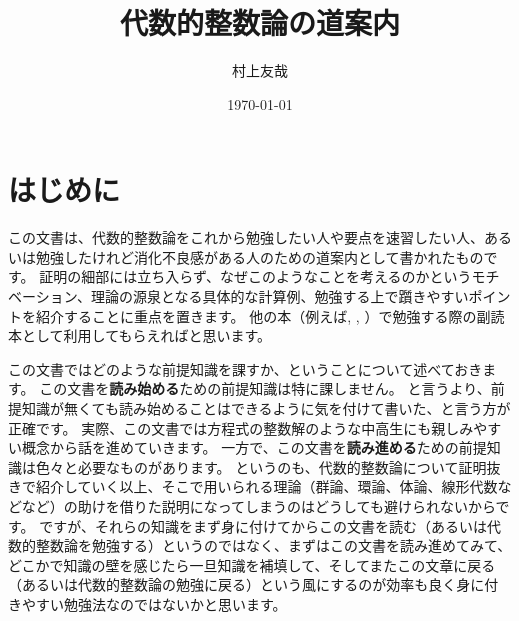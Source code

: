 \documentclass[11pt,b5paper,oneside,titlepage,lualatex]{ltjsreport}
\begin{document}

\title{代数的整数論の道案内}
\author{村上友哉}
\date{\today}
\maketitle



\chapter*{はじめに} \label{chap:intro}


この文書は、代数的整数論をこれから勉強したい人や要点を速習したい人、あるいは勉強したけれど消化不良感がある人のための道案内として書かれたものです。
証明の細部には立ち入らず、なぜこのようなことを考えるのかというモチベーション、理論の源泉となる具体的な計算例、勉強する上で躓きやすいポイントを紹介することに重点を置きます。
他の本（例えば\cite{Yukie1}, \cite{Yukie2}, \cite{Neu}）で勉強する際の副読本として利用してもらえればと思います。

この文書ではどのような前提知識を課すか、ということについて述べておきます。
この文書を\textbf{読み始める}ための前提知識は特に課しません。
と言うより、前提知識が無くても読み始めることはできるように気を付けて書いた、と言う方が正確です。
実際、この文書では方程式の整数解のような中高生にも親しみやすい概念から話を進めていきます。
一方で、この文書を\textbf{読み進める}ための前提知識は色々と必要なものがあります。
というのも、代数的整数論について証明抜きで紹介していく以上、そこで用いられる理論（群論、環論、体論、線形代数などなど）の助けを借りた説明になってしまうのはどうしても避けられないからです。
ですが、それらの知識をまず身に付けてからこの文書を読む（あるいは代数的整数論を勉強する）というのではなく、まずはこの文書を読み進めてみて、どこかで知識の壁を感じたら一旦知識を補填して、そしてまたこの文章に戻る（あるいは代数的整数論の勉強に戻る）という風にするのが効率も良く身に付きやすい勉強法なのではないかと思います。


\begin{quote}
	\centering
	[工事中]
\end{quote}


\end{document}
